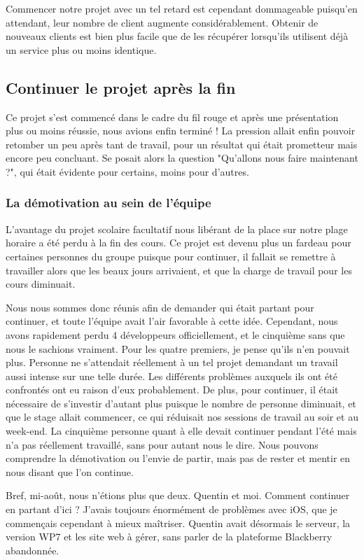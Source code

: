 \documentclass{article}
\begin{document}
		Commencer notre projet avec un tel retard est cependant dommageable puisqu'en attendant, leur nombre de client augmente considérablement. Obtenir de nouveaux clients est bien plus facile que de les récupérer lorsqu'ils utilisent déjà un service plus ou moins identique.
\subsection{Continuer le projet après la fin}
		Ce projet s'est commencé dans le cadre du fil rouge et après une présentation plus ou moins réussie, nous avions enfin terminé ! La pression allait enfin pouvoir retomber un peu après tant de travail, pour un résultat qui était prometteur mais encore peu concluant. Se posait alors la question "Qu'allons nous faire maintenant ?", qui était évidente pour certains, moins pour d'autres.
\subsubsection{La démotivation au sein de l'équipe}
		L'avantage du projet scolaire facultatif nous libérant de la place sur notre plage horaire a été perdu à la fin des cours. Ce projet est devenu plus un fardeau pour certaines personnes du groupe puisque pour continuer, il fallait se remettre à travailler alors que les beaux jours arrivaient, et que la charge de travail pour les cours diminuait. 
		
		Nous nous sommes donc réunis afin de demander qui était partant pour continuer, et toute l'équipe avait l'air favorable à cette idée. Cependant, nous avons rapidement perdu 4 développeurs officiellement, et le cinquième sans que nous le sachions vraiment. Pour les quatre premiers, je pense qu'ils n'en pouvait plus. Personne ne s'attendait réellement à un tel projet demandant un travail aussi intense sur une telle durée. Les différents problèmes auxquels ils ont été confrontés ont eu raison d'eux probablement. De plus, pour continuer, il était nécessaire de s'investir d'autant plus puisque le nombre de personne diminuait, et que le stage allait commencer, ce qui réduisait nos sessions de travail au soir et au week-end. La cinquième personne quant à elle devait continuer pendant l'été mais n'a pas réellement travaillé, sans pour autant nous le dire. Nous pouvons comprendre la démotivation ou l'envie de partir, mais pas de rester et mentir en nous disant que l'on continue. 
		
		Bref, mi-août, nous n'étions plus que deux. Quentin et moi. Comment continuer en partant d'ici ? J'avais toujours énormément de problèmes avec iOS, que je commençais cependant à mieux maîtriser. Quentin avait désormais le serveur, la version WP7 et les site web à gérer, sans parler de la plateforme Blackberry abandonnée.  
\end{document}
